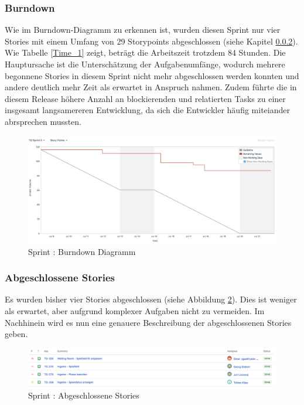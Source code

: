 \documentclass[12pt, titlepage]{scrartcl}
\newcommand{\RN}[1]{%
	\textup{\uppercase\expandafter{\romannumeral#1}}%
}
\newcounter{subsubsubsection}[subsubsection]
\begin{document}
        	\subsubsection{Burndown}
        		Wie im Burndown-Diagramm zu erkennen ist, wurden diesen Sprint nur vier Stories mit einem Umfang von 29 Storypoints abgeschlossen (siehe Kapitel \ref{done_stories_5}). Wie Tabelle \ref{Time_1} zeigt, betr\"agt die Arbeitszeit trotzdem 84 Stunden. Die Hauptursache ist die Untersch\"atzung der Aufgabenumf\"ange, wodurch mehrere begonnene Stories in diesem Sprint nicht mehr abgeschlossen werden konnten und andere deutlich mehr Zeit als erwartet in Anspruch nahmen. Zudem f\"uhrte die in diesem Release h\"ohere Anzahl an blockierenden und relatierten Tasks zu einer insgesamt langsamereren Entwicklung, da sich die Entwickler h\"aufig miteiander abrsprechen mussten.
	        	\begin{figure}[H] 
	        		\centering
	        		\includegraphics[width=\textwidth]{images/sprintV/burndown.png}
	        		\caption{Sprint \RN{5}: Burndown Diagramm}
	        		\label{Burndown_5}
	        	\end{figure} 
        	\subsubsection{Abgeschlossene Stories} \label{done_stories_5}
        		Es wurden bisher vier Stories abgeschlossen (siehe Abbildung \ref{Done_5}). Dies ist weniger als erwartet, aber aufgrund komplexer Aufgaben nicht zu vermeiden. Im Nachhinein wird es nun eine genauere Beschreibung der abgeschlossenen Stories geben.
        		\begin{figure}[H] 
        			\centering
        			\includegraphics[width=\textwidth]{images/sprintV/done.png}
        			\caption{Sprint \RN{5}: Abgeschlossene Stories}
        			\label{Done_5}
        		\end{figure}
\end{document}

